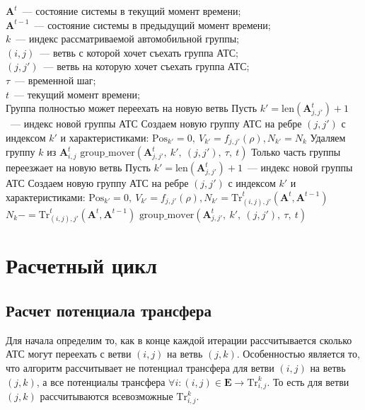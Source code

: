     \begin{algorithmic}
        \REQUIRE $\mathbf{A}^t$~--- состояние системы в текущий момент времени; \\
                 $\mathbf{A}^{t-1}$~--- состояние системы в предыдущий момент времени; \\
                 $k$~--- индекс рассматриваемой автомобильной группы; \\
                 $(i,j)$~--- ветвь с которой хочет съехать группа АТС; \\
                 $(j,j')$~--- ветвь на которую хочет съехать группа АТС; \\
                 $\tau$~--- временной шаг; \\
                 $t$~--- текущий момент времени; \\
            \STATE Группа полностью может переехать на новую ветвь
            \STATE Пусть $k' = \text{len}(\mathbf{A}^t_{j,j'}) + 1$~--- индекс новой группы АТС
            \STATE Создаем новую группу АТС на ребре $(j,j')$ с индексом $k'$ и характеристиками:
            \STATE $\mathrm{Pos}_{k'}  = 0,\ V_{k'}  = f_{j,j'}(\rho), N_{k'} = N_k$
            \STATE Удаляем группу $k$ из $\mathbf{A}^t_{i,j}$
            \STATE $\text{group\_mover}(\mathbf{A}^t_{j,j'},\ k',\ (j,j'),\ \tau,\ t)$
        \ELSE
            \STATE Только часть группы переезжает на новую ветвь
            \STATE Пусть $k' = \text{len}(\mathbf{A}^t_{j,j'}) + 1$~--- индекс новой группы АТС
            \STATE Создаем новую группу АТС на ребре $(j,j')$ с индексом $k'$ и характеристиками:
            \STATE $\mathrm{Pos}_{k'}  = 0,\ V_{k'}  = f_{j,j'}(\rho), N_{k'} = \text{Tr}_{(i, j), j'}^t (\mathbf{A}^t, \mathbf{A}^{t-1})$
            \STATE $N_k -= \text{Tr}_{(i, j), j'}^t (\mathbf{A}^t, \mathbf{A}^{t-1})$
            \STATE $\text{group\_mover}(\mathbf{A}^t_{j,j'},\ k',\ (j,j'),\ \tau,\ t)$
        \ENDIF
    \end{algorithmic}

\section{Расчетный цикл}
\label{sec:calc_loop}

\subsection{Расчет потенциала трансфера}
Для начала определим то, как в конце каждой итерации рассчитывается сколько АТС могут переехать с ветви $(i,j)$ на ветвь $(j,k)$.
Особенностью является то, что алгоритм рассчитывает не потенциал трансфера для ветви $(i,j)$ на ветвь $(j,k)$, а все потенциалы трансфера $\forall i: (i,j)\in \mathbf{E} \rightarrow \text{Tr}_{i, j}^k$.
То есть для ветви $(j,k)$ рассчитываются всевозможные $\text{Tr}_{i, j}^k$.

